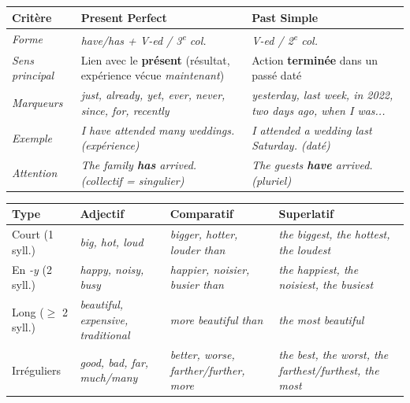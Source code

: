 \documentclass[11pt]{article}
\newcommand{\eng}[1]{\ifmmode\text{\textit{#1}}\else\begingroup\selectlanguage{english}\itshape #1\endgroup\fi}
\begin{document}
\begin{propriete}
\begin{center}
\begin{tabularx}{\linewidth}{|X|X|X|}
\hline
\rowcolor{popblueL}
\textbf{Critère} & \textbf{Present Perfect} & \textbf{Past Simple} \\
\hline
\emph{Forme} & \eng{have/has + V-ed / 3\textsuperscript{e} col.} & \eng{V-ed / 2\textsuperscript{e} col.} \\
\hline
\emph{Sens principal} & Lien avec le \textbf{présent} (résultat, expérience vécue \emph{maintenant}) & Action \textbf{terminée} dans un passé daté \\
\hline
\emph{Marqueurs} & \eng{just, already, yet, ever, never, since, for, recently} & \eng{yesterday, last week, in 2022, two days ago, when I was...} \\
\hline
\emph{Exemple} & \eng{I have attended many weddings.} (expérience) & \eng{I attended a wedding last Saturday.} (daté) \\
\hline
\emph{Attention} & \eng{The family \textbf{has} arrived.} (collectif = singulier) & \eng{The guests \textbf{have} arrived.} (pluriel) \\
\hline
\end{tabularx}
\end{center}
\end{propriete}

\begin{propriete}
\begin{center}
\begin{tabular}{|l|l|l|l|}
\hline
\rowcolor{popblueL}
\textbf{Type} & \textbf{Adjectif} & \textbf{Comparatif} & \textbf{Superlatif} \\
\hline
Court (1 syll.) & \eng{big, hot, loud} & \eng{bigger, hotter, louder than} & \eng{the biggest, the hottest, the loudest} \\
\hline
En \emph{-y} (2 syll.) & \eng{happy, noisy, busy} & \eng{happier, noisier, busier than} & \eng{the happiest, the noisiest, the busiest} \\
\hline
Long ($\ge$ 2 syll.) & \eng{beautiful, expensive, traditional} & \eng{more beautiful than} & \eng{the most beautiful} \\
\hline
Irréguliers & \eng{good, bad, far, much/many} & \eng{better, worse, farther/further, more} & \eng{the best, the worst, the farthest/furthest, the most} \\
\hline
\end{tabular}
\end{center}
\end{propriete}
\end{document}
